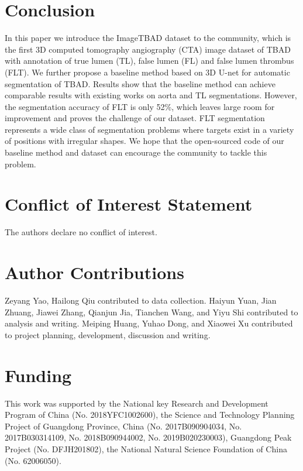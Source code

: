 \documentclass{article}
\begin{document}
\section{Conclusion}
In this paper we introduce the ImageTBAD dataset to the community, which is the first 3D computed tomography angiography (CTA) image dataset of TBAD with annotation of true lumen (TL), false lumen (FL) and false lumen thrombus (FLT).
We further propose a baseline method based on 3D U-net for automatic segmentation of TBAD.
Results show that the baseline method can achieve comparable results with existing works on aorta and TL segmentations.
However, the segmentation accuracy of FLT is only 52\%, which leaves large room for improvement and proves the challenge of our dataset.
FLT segmentation represents a wide class of segmentation problems where targets exist in a variety of positions with irregular shapes.
We hope that the open-sourced code of our baseline method and dataset can encourage the community to tackle this problem.



\section*{Conflict of Interest Statement}

The authors declare no conflict of interest.

\section*{Author Contributions}

Zeyang Yao, Hailong Qiu contributed to data collection. Haiyun Yuan, Jian Zhuang, Jiawei Zhang, Qianjun Jia, Tianchen Wang, and Yiyu Shi contributed to analysis and writing. Meiping Huang, Yuhao Dong, and Xiaowei Xu
contributed to project planning, development, discussion and writing.

\section*{Funding}
This work was supported by the National key Research and Development Program of China (No. 2018YFC1002600), the Science and Technology Planning Project of Guangdong Province, China (No. 2017B090904034, No. 2017B030314109, No. 2018B090944002, No. 2019B020230003), Guangdong Peak Project (No. DFJH201802), the National Natural Science Foundation of China (No. 62006050).
\end{document}
